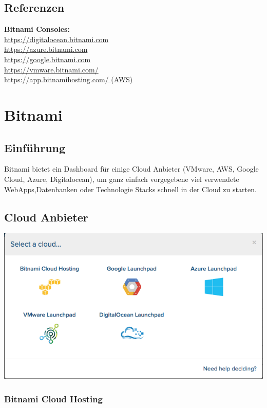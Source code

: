 \documentclass[11pt]{scrartcl}
\begin{document}
\subsection{Referenzen}
\textbf{Bitnami Consoles:}\\
\href{https://digitalocean.bitnami.com}{https://digitalocean.bitnami.com}\\
\href{https://azure.bitnami.com}{https://azure.bitnami.com}\\
\href{https://google.bitnami.com}{https://google.bitnami.com}\\
\href{https://vmware.bitnami.com/}{https://vmware.bitnami.com/}\\
\href{https://app.bitnamihosting.com/}{https://app.bitnamihosting.com/ (AWS)}\\

\section{Bitnami}
\subsection{Einführung}
Bitnami bietet ein Dashboard für einige Cloud Anbieter (VMware, AWS, Google Cloud, Azure, 
Digitalocean), um ganz einfach vorgegebene viel verwendete WebApps,Datenbanken oder Technologie Stacks 
schnell in der Cloud zu starten.

\subsection{Cloud Anbieter}
\includegraphics[width=\textwidth]{clouds}
\subsubsection{Bitnami Cloud Hosting}
\end{document}
